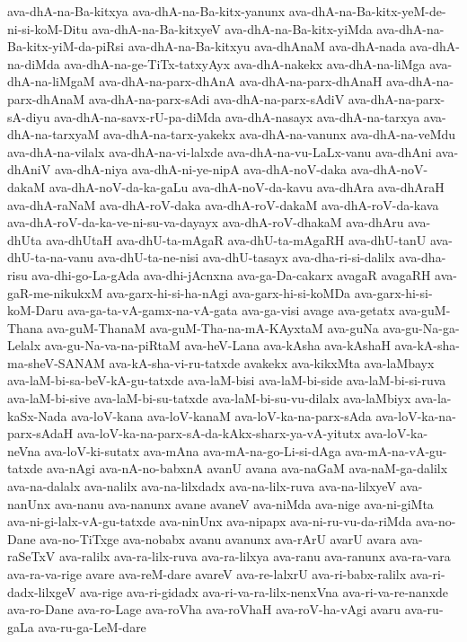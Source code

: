 {ava-dhA-na-Ba-kitxya
ava-dhA-na-Ba-kitx-yanunx
ava-dhA-na-Ba-kitx-yeM-de-ni-si-koM-Ditu
ava-dhA-na-Ba-kitxyeV
ava-dhA-na-Ba-kitx-yiMda
ava-dhA-na-Ba-kitx-yiM-da-piRsi
ava-dhA-na-Ba-kitxyu
ava-dhAnaM
ava-dhA-nada
ava-dhA-na-diMda
ava-dhA-na-ge-TiTx-tatxyAyx
ava-dhA-nakekx
ava-dhA-na-liMga
ava-dhA-na-liMgaM
ava-dhA-na-parx-dhAnA
ava-dhA-na-parx-dhAnaH
ava-dhA-na-parx-dhAnaM
ava-dhA-na-parx-sAdi
ava-dhA-na-parx-sAdiV
ava-dhA-na-parx-sA-diyu
ava-dhA-na-savx-rU-pa-diMda
ava-dhA-nasayx
ava-dhA-na-tarxya
ava-dhA-na-tarxyaM
ava-dhA-na-tarx-yakekx
ava-dhA-na-vanunx
ava-dhA-na-veMdu
ava-dhA-na-vilalx
ava-dhA-na-vi-lalxde
ava-dhA-na-vu-LaLx-vanu
ava-dhAni
ava-dhAniV
ava-dhA-niya
ava-dhA-ni-ye-nipA
ava-dhA-noV-daka
ava-dhA-noV-dakaM
ava-dhA-noV-da-ka-gaLu
ava-dhA-noV-da-kavu
ava-dhAra
ava-dhAraH
ava-dhA-raNaM
ava-dhA-roV-daka
ava-dhA-roV-dakaM
ava-dhA-roV-da-kava
ava-dhA-roV-da-ka-ve-ni-su-va-dayayx
ava-dhA-roV-dhakaM
ava-dhAru
ava-dhUta
ava-dhUtaH
ava-dhU-ta-mAgaR
ava-dhU-ta-mAgaRH
ava-dhU-tanU
ava-dhU-ta-na-vanu
ava-dhU-ta-ne-nisi
ava-dhU-tasayx
ava-dha-ri-si-dalilx
ava-dha-risu
ava-dhi-go-La-gAda
ava-dhi-jAcnxna
ava-ga-Da-cakarx
avagaR
avagaRH
ava-gaR-me-nikukxM
ava-garx-hi-si-ha-nAgi
ava-garx-hi-si-koMDa
ava-garx-hi-si-koM-Daru
ava-ga-ta-vA-gamx-na-vA-gata
ava-ga-visi
avage
ava-getatx
ava-guM-Thana
ava-guM-ThanaM
ava-guM-Tha-na-mA-KAyxtaM
ava-guNa
ava-gu-Na-ga-Lelalx
ava-gu-Na-va-na-piRtaM
ava-heV-Lana
ava-kAsha
ava-kAshaH
ava-kA-sha-ma-sheV-SANAM
ava-kA-sha-vi-ru-tatxde
avakekx
ava-kikxMta
ava-laMbayx
ava-laM-bi-sa-beV-kA-gu-tatxde
ava-laM-bisi
ava-laM-bi-side
ava-laM-bi-si-ruva
ava-laM-bi-sive
ava-laM-bi-su-tatxde
ava-laM-bi-su-vu-dilalx
ava-laMbiyx
ava-la-kaSx-Nada
ava-loV-kana
ava-loV-kanaM
ava-loV-ka-na-parx-sAda
ava-loV-ka-na-parx-sAdaH
ava-loV-ka-na-parx-sA-da-kAkx-sharx-ya-vA-yitutx
ava-loV-ka-neVna
ava-loV-ki-sutatx
ava-mAna
ava-mA-na-go-Li-si-dAga
ava-mA-na-vA-gu-tatxde
ava-nAgi
ava-nA-no-babxnA
avanU
avana
ava-naGaM
ava-naM-ga-dalilx
ava-na-dalalx
ava-nalilx
ava-na-lilxdadx
ava-na-lilx-ruva
ava-na-lilxyeV
ava-nanUnx
ava-nanu
ava-nanunx
avane
avaneV
ava-niMda
ava-nige
ava-ni-giMta
ava-ni-gi-lalx-vA-gu-tatxde
ava-ninUnx
ava-nipapx
ava-ni-ru-vu-da-riMda
ava-no-Dane
ava-no-TiTxge
ava-nobabx
avanu
avanunx
ava-rArU
avarU
avara
ava-raSeTxV
ava-ralilx
ava-ra-lilx-ruva
ava-ra-lilxya
ava-ranu
ava-ranunx
ava-ra-vara
ava-ra-va-rige
avare
ava-reM-dare
avareV
ava-re-lalxrU
ava-ri-babx-ralilx
ava-ri-dadx-lilxgeV
ava-rige
ava-ri-gidadx
ava-ri-va-ra-lilx-nenxVna
ava-ri-va-re-nanxde
ava-ro-Dane
ava-ro-Lage
ava-roVha
ava-roVhaH
ava-roV-ha-vAgi
avaru
ava-ru-gaLa
ava-ru-ga-LeM-dare
}
